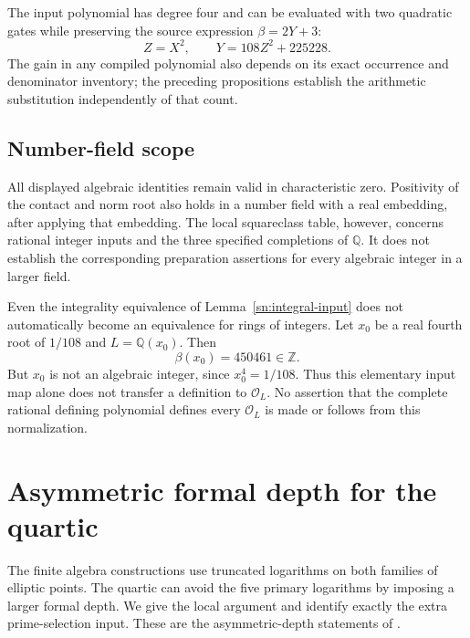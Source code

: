 \documentclass[11pt,a4paper]{article}
\theoremstyle{definition}
\theoremstyle{remark}
\begin{document}
The input polynomial has degree four and can be evaluated with
two quadratic gates while preserving the source expression
$\beta=2Y+3$:
\[
                    Z=X^2,\qquad Y=108Z^2+225228.
\]
The gain in any compiled polynomial also depends on its exact
occurrence and denominator inventory; the preceding propositions
establish the arithmetic substitution independently of that count.

\subsection{Number-field scope}

All displayed algebraic identities remain valid in characteristic
zero.  Positivity of the contact and norm root also holds in a
number field with a real embedding, after applying that embedding.
The local squareclass table, however, concerns rational integer
inputs and the three specified completions of $\mathbb Q$.
It does not establish the corresponding preparation assertions
for every algebraic integer in a larger field.

Even the integrality equivalence of Lemma~\ref{sn:integral-input}
does not automatically become an equivalence for rings of
integers.  Let $x_0$ be a real fourth root of $1/108$ and
$L=\mathbb Q(x_0)$.  Then
\[
                       \beta(x_0)=450461\in\mathbb Z.
\]
But $x_0$ is not an algebraic integer, since $x_0^4=1/108$.
Thus this elementary input map
alone does not transfer a definition to $\mathcal O_L$.
No assertion that the complete rational defining polynomial
defines every $\mathcal O_L$ is made or follows from this
normalization.


\section{Asymmetric formal depth for the quartic}
\label{sec:asymmetric-depth}

The finite algebra constructions use truncated logarithms on both
families of elliptic points. The quartic can avoid the five primary
logarithms by imposing a larger formal depth. We give the local
argument and identify exactly the extra prime-selection input.
These are the asymmetric-depth statements of
\cite[Section ``Replacing five logarithms by asymmetric formal
depth'']{RepositoryV9}.
\end{document}
